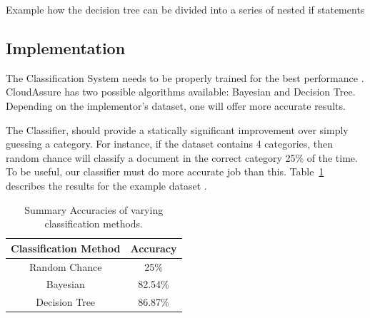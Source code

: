\begin{algorithm}
    \label{alg:decision_tree}
    \caption{Example how the decision tree can be divided into a series of
    nested if statements}
\begin{algorithmic}
                \EndIf
                \EndIf
                        \EndIf
                        \EndIf
                                \EndIf
                            \EndIf
                        \EndIf
                    \EndIf
                \EndIf
            \EndIf
        \EndIf
\end{algorithmic}
\end{algorithm}

\subsection{Implementation}
The Classification System
needs to be properly trained for the best performance \autocite{Russell2008}.
CloudAssure has two possible algorithms available: Bayesian and Decision Tree.
Depending on the implementor's dataset, one will offer more accurate results.

The Classifier, should provide a statically significant improvement over simply
guessing a category. For instance, if the dataset contains 4 categories, then
random chance will classify a document in the correct category 25\% of the time.
To be useful, our classifier must do more accurate job than this.
Table~\ref{tab:classification_accuracy} describes the results for the example
dataset \autocite{University}.

\begin{table}[h!]
    \centering
    \begin{tabular}{c | c }
        \hline
        Classification Method & Accuracy \\
        \hline \hline
        Random Chance & 25\%\\
        Bayesian & 82.54\% \\
        Decision Tree & 86.87\% \\
    \end{tabular}
    \caption{Summary Accuracies of varying classification methods.}
    \label{tab:classification_accuracy}
\end{table}


